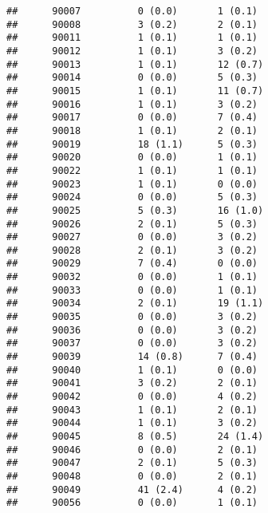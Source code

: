 \documentclass[]{article}
\begin{document}
\begin{verbatim}
##      90007          0 (0.0)       1 (0.1)                        
##      90008          3 (0.2)       2 (0.1)                        
##      90011          1 (0.1)       1 (0.1)                        
##      90012          1 (0.1)       3 (0.2)                        
##      90013          1 (0.1)       12 (0.7)                       
##      90014          0 (0.0)       5 (0.3)                        
##      90015          1 (0.1)       11 (0.7)                       
##      90016          1 (0.1)       3 (0.2)                        
##      90017          0 (0.0)       7 (0.4)                        
##      90018          1 (0.1)       2 (0.1)                        
##      90019          18 (1.1)      5 (0.3)                        
##      90020          0 (0.0)       1 (0.1)                        
##      90022          1 (0.1)       1 (0.1)                        
##      90023          1 (0.1)       0 (0.0)                        
##      90024          0 (0.0)       5 (0.3)                        
##      90025          5 (0.3)       16 (1.0)                       
##      90026          2 (0.1)       5 (0.3)                        
##      90027          0 (0.0)       3 (0.2)                        
##      90028          2 (0.1)       3 (0.2)                        
##      90029          7 (0.4)       0 (0.0)                        
##      90032          0 (0.0)       1 (0.1)                        
##      90033          0 (0.0)       1 (0.1)                        
##      90034          2 (0.1)       19 (1.1)                       
##      90035          0 (0.0)       3 (0.2)                        
##      90036          0 (0.0)       3 (0.2)                        
##      90037          0 (0.0)       3 (0.2)                        
##      90039          14 (0.8)      7 (0.4)                        
##      90040          1 (0.1)       0 (0.0)                        
##      90041          3 (0.2)       2 (0.1)                        
##      90042          0 (0.0)       4 (0.2)                        
##      90043          1 (0.1)       2 (0.1)                        
##      90044          1 (0.1)       3 (0.2)                        
##      90045          8 (0.5)       24 (1.4)                       
##      90046          0 (0.0)       2 (0.1)                        
##      90047          2 (0.1)       5 (0.3)                        
##      90048          0 (0.0)       2 (0.1)                        
##      90049          41 (2.4)      4 (0.2)                        
##      90056          0 (0.0)       1 (0.1)                        

\end{verbatim}
\end{document}
